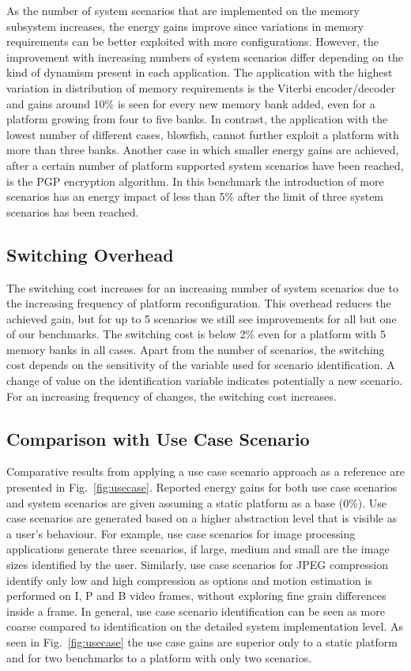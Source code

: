 \documentclass[smallcondensed]{svjour3}
\begin{document}
As the number of system scenarios that are implemented on the memory subsystem increases, the energy gains improve since variations in memory requirements can be better exploited with more configurations. 
However, the improvement with increasing numbers of system scenarios differ depending on the kind of dynamism present in each application. 
The application with the highest variation in distribution of memory requirements is the Viterbi encoder/decoder and gains around 10\% is seen for every new memory bank added, even for a platform growing from four to five banks. 
In contrast, the application with the lowest number of different cases, blowfish, cannot further exploit a platform with more than three banks. 
Another case in which smaller energy gains are achieved, after a certain number of platform supported system scenarios have been reached, is the PGP encryption algorithm. 
In this benchmark the introduction of more scenarios has an energy impact of less than 5\% after the limit of three system scenarios has been reached. 

\subsection{Switching Overhead}

The switching cost increases for an increasing number of system scenarios due to the increasing frequency of platform reconfiguration. 
This overhead reduces the achieved gain, but for up to 5 scenarios we still see improvements for all but one of our benchmarks. 
The switching cost is below 2\% even for a platform with 5 memory banks in all cases.
Apart from the number of scenarios, the switching cost depends on the sensitivity of the variable used for scenario identification. 
A change of value on the identification variable indicates potentially a new scenario. 
For an increasing frequency of changes, the switching cost increases.

\subsection{Comparison with Use Case Scenario}

Comparative results from applying a use case scenario approach as a reference are presented in Fig.~\ref{fig:usecase}. 
Reported energy gains for both use case scenarios and system scenarios are given assuming a static platform as a base (0\%). 
Use case scenarios are generated based on a higher abstraction level that is visible as a user's behaviour. 
For example, use case scenarios for image processing applications generate three scenarios, if large, medium and small are the image sizes identified by the user. 
Similarly, use case scenarios for JPEG compression identify only low and high compression as options and motion estimation is performed on I, P and B video frames, without exploring fine grain differences inside a frame. 
In general, use case scenario identification can be seen as more coarse compared to identification on the detailed system implementation level. 
As seen in Fig.~\ref{fig:usecase} the use case gains are superior only to a static platform and for two benchmarks to a platform with only two scenarios.
\end{document}

